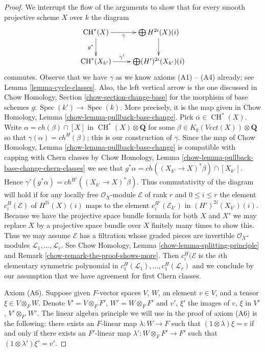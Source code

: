 \documentclass{stacks-project}
\theoremstyle{plain}
\theoremstyle{definition}
\theoremstyle{remark}
\numberwithin{equation}{subsection}
\def\Spec{\mathop{\mathrm{Spec}}}
\def\CH{\mathop{\mathrm{CH}}\nolimits}
\begin{document}
\begin{proof}
\medskip\noindent
We interrupt the flow of the arguments to show that for every
smooth projective scheme $X$ over $k$ the diagram
$$
\xymatrix{
\CH^*(X) \ar[r]_-\gamma \ar[d]_{g^*} & \bigoplus H^{2i}(X)(i) \ar[d] \\
\CH^*(X_{k'}) \ar[r]^-{\gamma'} & \bigoplus (H')^{2i}(X_{k'})(i)
}
$$
commutes. Observe that we have $\gamma$ as we know axioms
(A1) -- (A4) already; see Lemma \ref{lemma-cycle-classes}.
Also, the left vertical arrow is the one discussed in
Chow Homology, Section \ref{chow-section-change-base}
for the morphism of base schemes $g : \Spec(k') \to \Spec(k)$.
More precisely, it is the map given in
Chow Homology, Lemma \ref{chow-lemma-pullback-base-change}.
Pick $\alpha \in \CH^*(X)$. Write $\alpha = ch(\beta) \cap [X]$
in $\CH^*(X) \otimes \mathbf{Q}$
for some $\beta \in K_0(\textit{Vect}(X)) \otimes \mathbf{Q}$
so that $\gamma(\alpha) = ch^{H}(\beta)$; this is our construction of $\gamma$.
Since the map of Chow Homology, Lemma \ref{chow-lemma-pullback-base-change}
is compatible with capping with Chern classes by
Chow Homology, Lemma \ref{chow-lemma-pullback-base-change-chern-classes}
we see that $g^*\alpha = ch((X_{k'} \to X)^*\beta) \cap [X_{k'}]$.
Hence $\gamma'(g^*\alpha) = ch^{H'}((X_{k'} \to X)^*\beta)$.
Thus commutativity of the diagram will hold if for any locally
free $\mathcal{O}_X$-module $\mathcal{E}$ of rank $r$ and $0 \leq i \leq r$
the element $c_i^H(\mathcal{E})$ of $H^{2i}(X)(i)$
maps to the element $c_i^{H'}(\mathcal{E}_{k'})$ in $(H')^{2i}(X_{k'})(i)$.
Because we have the projective space bundle formula for both
$X$ and $X'$ we may replace $X$ by a projective space bundle
over $X$ finitely many times to show this. Thus we may assume
$\mathcal{E}$ has a filtration whose graded pieces are
invertible $\mathcal{O}_X$-modules
$\mathcal{L}_1, \ldots, \mathcal{L}_r$.
See Chow Homology, Lemma \ref{chow-lemma-splitting-principle} and
Remark \ref{chow-remark-the-proof-shows-more}.
Then $c^H_i(\mathcal{E}$ is the $i$th elementary symmetric polynomial
in $c^H_1(\mathcal{L}_1), \ldots, c^H_1(\mathcal{L}_r)$
and we conclude by our assumption that we have agreement for
first Chern classes.

\medskip\noindent
Axiom (A6). Suppose given $F$-vector spaces
$V$, $W$, an element $v \in V$, and a tensor $\xi \in V \otimes_F W$.
Denote $V' = V \otimes_F F'$, $W' = W \otimes_F F'$ and $v'$, $\xi'$
the images of $v$, $\xi$ in $V'$, $V' \otimes_{F'} W'$. The linear algebra
principle we will use in the proof of axiom (A6) is the following:
there exists an $F$-linear map $\lambda : W \to F$ such that
$(1 \otimes \lambda)\xi = v$ if and only if there exists an $F'$-linear
map $\lambda' : W \otimes_F F' \to F'$ such that
$(1 \otimes \lambda')\xi' = v'$.


\end{proof}
\end{document}
